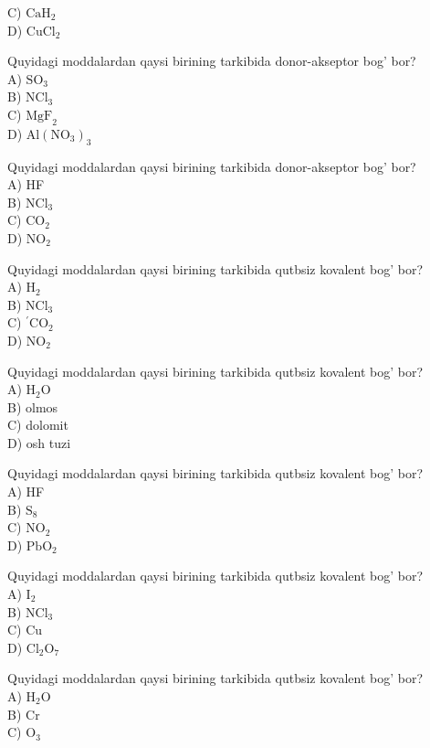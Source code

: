 C) $\mathrm{CaH}_{2}$\\
D) $\mathrm{CuCl}_{2}$
  \item Quyidagi moddalardan qaysi birining tarkibida donor-akseptor bog' bor?\\
A) $\mathrm{SO}_{3}$\\
B) $\mathrm{NCl}_{3}$\\
C) $\mathrm{MgF}_{2}$\\
D) $\mathrm{Al}\left(\mathrm{NO}_{3}\right)_{3}$
  \item Quyidagi moddalardan qaysi birining tarkibida donor-akseptor bog' bor?\\
A) HF\\
B) $\mathrm{NCl}_{3}$\\
C) $\mathrm{CO}_{2}$\\
D) $\mathrm{NO}_{2}$
  \item Quyidagi moddalardan qaysi birining tarkibida qutbsiz kovalent bog' bor?\\
A) $\mathrm{H}_{2}$\\
B) $\mathrm{NCl}_{3}$\\
C) ${ }^{\prime} \mathrm{CO}_{2}$\\
D) $\mathrm{NO}_{2}$
  \item Quyidagi moddalardan qaysi birining tarkibida qutbsiz kovalent bog' bor?\\
A) $\mathrm{H}_{2} \mathrm{O}$\\
B) olmos\\
C) dolomit\\
D) osh tuzi
  \item Quyidagi moddalardan qaysi birining tarkibida qutbsiz kovalent bog' bor?\\
A) HF\\
B) $\mathrm{S}_{8}$\\
C) $\mathrm{NO}_{2}$\\
D) $\mathrm{PbO}_{2}$
  \item Quyidagi moddalardan qaysi birining tarkibida qutbsiz kovalent bog' bor?\\
A) $\mathrm{I}_{2}$\\
B) $\mathrm{NCl}_{3}$\\
C) Cu\\
D) $\mathrm{Cl}_{2} \mathrm{O}_{7}$
  \item Quyidagi moddalardan qaysi birining tarkibida qutbsiz kovalent bog' bor?\\
A) $\mathrm{H}_{2} \mathrm{O}$\\
B) Cr\\
C) $\mathrm{O}_{3}$\\
